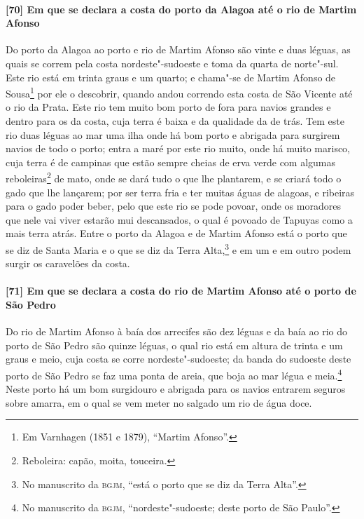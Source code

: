 \begin{linenumbers}
\paragraph{[70] Em que se declara a costa do porto da Alagoa até o rio de Martim Afonso} \quad
Do porto da Alagoa ao porto e rio de Martim Afonso são vinte e duas léguas, as quais se
correm pela costa nordeste"-sudoeste e toma da quarta de norte"-sul. Este rio está em trinta
graus e um quarto; e chama"-se de Martim Afonso de Sousa\footnote{ Em Varnhagen (1851 e
1879), ``Martim Afonso''.} por ele o descobrir, quando andou correndo esta costa de São
Vicente até o rio da Prata. Este rio tem muito bom porto de fora para navios grandes e
dentro para os da costa, cuja terra é baixa e da qualidade da de trás. Tem este rio duas
léguas ao mar uma ilha onde há bom porto e abrigada para surgirem navios de todo o porto;
entra a maré por este rio muito, onde há muito marisco, cuja terra é de campinas que estão
sempre cheias de erva verde com algumas reboleiras\footnote{ Reboleira: capão, moita,
touceira.} de mato, onde se dará tudo o que lhe plantarem, e se criará todo o gado que lhe
lançarem; por ser terra fria e ter muitas águas de alagoas, e ribeiras para o gado poder
beber, pelo que este rio se pode povoar, onde os moradores que nele vai viver estarão mui
descansados, o qual é povoado de Tapuyas como a mais terra atrás. Entre o porto da Alagoa
e de Martim Afonso está o porto que se diz de Santa Maria e o que se diz da Terra
Alta,\footnote{ No manuscrito da \textsc{bgjm}, ``está o porto que se diz da Terra
Alta''.} e em um e em outro podem surgir os caravelões da costa.

\paragraph{[71] Em que se declara a costa do rio de Martim Afonso até o porto de São Pedro} \quad
Do rio de Martim Afonso à baía dos arrecifes são dez léguas e da baía ao rio do porto de
São Pedro são quinze léguas, o qual rio está em altura de trinta e um graus e meio, cuja
costa se corre nordeste"-sudoeste; da banda do sudoeste deste porto de São Pedro se faz uma
ponta de areia, que boja ao mar légua e meia.\footnote{ No manuscrito da \textsc{bgjm},
``nordeste"-sudoeste; deste porto de São Paulo''.} Neste porto há um bom surgidouro e
abrigada para os navios entrarem seguros sobre amarra, em o qual se vem meter no salgado
um rio de água doce.


\end{linenumbers}
